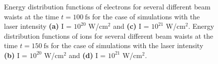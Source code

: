 \begin{figure}[h!]
	\hspace{1mm}
	\caption{Energy distribution functions of electrons for several different beam waists at the time $ t = 100 \ \mathrm{fs} $ for the case of simulations with the laser intensity \textbf{(a)} I = $ 10^{20} $ W/cm$^2$ and \textbf{(c)} I = $ 10^{21} $ W/cm$^2$. Energy distribution functions of ions for several different beam waists at the time $ t = 150 \ \mathrm{fs} $ for the case of simulations with the laser intensity \textbf{(b)} I = $ 10^{20} $ W/cm$^2$ and \textbf{(d)} I = $ 10^{21} $ W/cm$^2$.}
	\label{fig:14}
\end{figure}